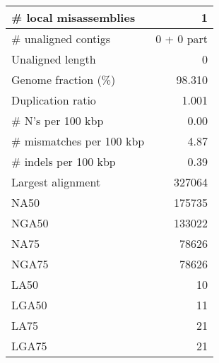 \documentclass[12pt,a4paper]{article}
\begin{document}
\begin{table}[ht]
\begin{center}
\begin{tabular}{|l*{1}{|r}|}
\# local misassemblies & 1 \\ \hline
\# unaligned contigs & 0 + 0 part \\ \hline
Unaligned length & 0 \\ \hline
Genome fraction (\%) & 98.310 \\ \hline
Duplication ratio & 1.001 \\ \hline
\# N's per 100 kbp & 0.00 \\ \hline
\# mismatches per 100 kbp & 4.87 \\ \hline
\# indels per 100 kbp & 0.39 \\ \hline
Largest alignment & 327064 \\ \hline
NA50 & 175735 \\ \hline
NGA50 & 133022 \\ \hline
NA75 & 78626 \\ \hline
NGA75 & 78626 \\ \hline
LA50 & 10 \\ \hline
LGA50 & 11 \\ \hline
LA75 & 21 \\ \hline
LGA75 & 21 \\ \hline
\end{tabular}
\end{center}
\end{table}
\end{document}
